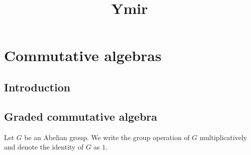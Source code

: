 
\title{Ymir}

\maketitle
\tableofcontents



\chapter*{Commutative algebras}\label{chap-commutative}


\section{Introduction}\label{sec-introduction-Commutativealgebra}

\section{Graded commutative algebra}
Let $G$ be an Abelian group. We write the group operation of $G$ multiplicatively and denote the identity of $G$ as $1$.

